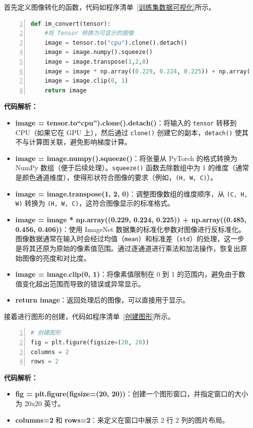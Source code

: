 首先定义图像转化的函数，代码如程序清单~\ref{训练集数据可视化}所示。
\begin{lstlisting}[language={python},label={训练集数据可视化},caption={训练集数据可视化}, basicstyle=\footnotesize\ttfamily, breaklines=true, numbers=left, frame=single,keepspaces=true,showstringspaces=false]
def im_convert(tensor):
    #将 Tensor 转换为可显示的图像
    image = tensor.to("cpu").clone().detach()
    image = image.numpy().squeeze()
    image = image.transpose(1,2,0)
    image = image * np.array((0.229, 0.224, 0.225)) + np.array((0.485, 0.456, 0.406))
    image = image.clip(0, 1)
    return image
\end{lstlisting}
\textbf{代码解析：}
\begin{itemize}
    \item \textbf{image = tensor.to“cpu”).clone().detach()}：将输入的 \texttt{tensor} 转移到 CPU（如果它在 GPU 上），然后通过 \texttt{clone()} 创建它的副本，\texttt{detach()} 使其不与计算图关联，避免影响梯度计算。
    
    \item \textbf{image = image.numpy().squeeze()}：将张量从 PyTorch 的格式转换为 NumPy 数组（便于后续处理）。\texttt{squeeze()} 函数去除数组中为 1 的维度（通常是颜色通道维度），使得形状符合图像的要求（例如，\texttt{(H, W, C)}）。
    
    \item \textbf{image = image.transpose(1, 2, 0)}：调整图像数组的维度顺序，从 \texttt{(C, H, W)} 转换为 \texttt{(H, W, C)}，这符合图像显示的标准格式。
    
    \item \textbf{image = image * np.array((0.229, 0.224, 0.225)) + np.array((0.485, 0.456, 0.406))}：使用 ImageNet 数据集的标准化参数对图像进行反标准化。图像数据通常在输入时会经过均值（\texttt{mean}）和标准差（\texttt{std}）的处理，这一步是将其还原为原始的像素值范围。通过逐通道进行乘法和加法操作，恢复出原始图像的亮度和对比度。
    
    \item \textbf{image = image.clip(0, 1)}：将像素值限制在 0 到 1 的范围内，避免由于数值变化超出范围而导致的错误或异常显示。
    
    \item \textbf{return image}：返回处理后的图像，可以直接用于显示。
\end{itemize}


接着进行图形的创建，代码如程序清单~\ref{创建图形}所示。
\begin{lstlisting}[language={python},label={创建图形},caption={创建图形}, basicstyle=\footnotesize\ttfamily, breaklines=true, numbers=left, frame=single,keepspaces=true,showstringspaces=false]
# 创建图形
fig = plt.figure(figsize=(20, 20))
columns = 2
rows = 2
\end{lstlisting}
\textbf{代码解析：}
\begin{itemize}
    \item \textbf{fig = plt.figure(figsize=(20, 20))}：创建一个图形窗口，并指定窗口的大小为 20x20 英寸。
    \item \textbf{columns=2} 和 \textbf{rows=2}：来定义在窗口中展示 2 行 2 列的图片布局。
\end{itemize}
    
